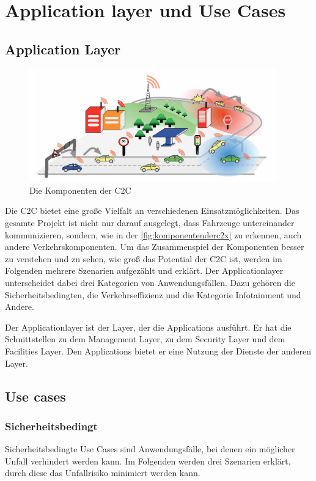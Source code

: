 \chapter{Application layer und Use Cases\label{chap:usecases}}
\section{Application Layer \label{sec:applicationLayer}}
\begin{figure}[htbp]
\includegraphics[width=0.95\textwidth]{content/images/06_use_cases/komponenten.png}
\caption{Die Komponenten der \acl{C2C} \cite{etsi102638}}
\label{fig:komponentenderc2x}
\end{figure}
Die \acl{C2C} bietet eine große Vielfalt an verschiedenen Ein\-satz\-mög\-lich\-keit\-en. Das gesamte Projekt ist nicht nur darauf ausgelegt, dass Fahrzeuge untereinander kommunizieren, sondern, wie in der \autoref{fig:komponentenderc2x} zu erkennen, auch andere Verkehrskomponenten. Um das Zusammenspiel der Komponenten besser zu verstehen und zu sehen, wie groß das Potential der \acl{C2C} ist, werden im Folgenden mehrere Szenarien aufgezählt und erklärt. Der Applicationlayer unterscheidet dabei drei Kategorien von Anwendungsfällen. Dazu gehören die Sicherheitsbedingten, die Verkehrseffizienz und die Kategorie Infotainment und Andere.

Der Applicationlayer ist der Layer, der die Applications ausführt. Er hat die Schnittstellen zu dem Management Layer, zu dem Security Layer und dem Facilities Layer. Den Applications bietet er eine Nutzung der Dienste der anderen Layer. 

\section{Use cases}
\subsection{Sicherheitsbedingt}
Sicherheitsbedingte Use Cases sind Anwendungsfälle, bei denen ein möglicher Unfall verhindert werden kann. Im Folgenden werden drei Szenarien erklärt, durch diese das Unfallrisiko minimiert werden kann.

